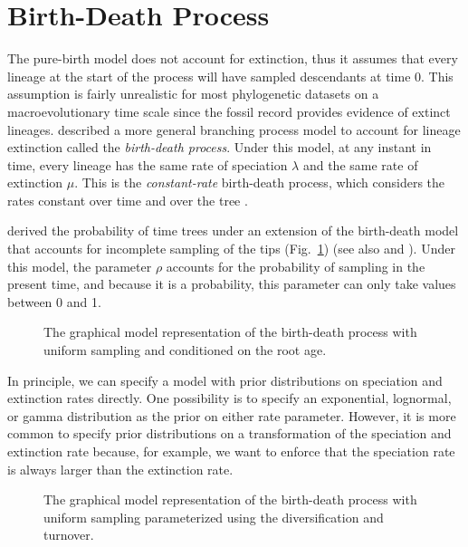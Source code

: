 \bigskip
\section{Birth-Death Process}\label{birthDeathSec}

The pure-birth model does not account for extinction, thus it assumes that every lineage at the start of the process will have sampled descendants at time 0.
This assumption is fairly unrealistic for most phylogenetic datasets on a macroevolutionary time scale since the fossil record provides evidence of extinct lineages.
\citet{Kendall1948} described a more general branching process model to account for lineage extinction called the \emph{birth-death process}.
Under this model, at any instant in time, every lineage has the same rate of speciation $\lambda$ and the same rate of extinction $\mu$.
This is the \emph{constant-rate} birth-death process, which considers the rates constant over time and over the tree \citep{Nee1994b,Hoehna2015a}.

\citet{Yang1997} derived the probability of time trees under an extension of the birth-death model that accounts for incomplete sampling of the tips (Fig.~\ref{bdrGMFig1}) (see also \cite{Stadler2009} and \cite{Hoehna2014a}).
Under this model, the parameter $\rho$ accounts for the probability of sampling in the present time, and because it is a probability, this parameter can only take values between 0 and 1.
\begin{figure}[h!]
\centering
{}
\caption{\small The graphical model representation of the birth-death process with uniform sampling and conditioned on the root age.}
\label{bdrGMFig1}
\end{figure}

In principle, we can specify a model with prior distributions on speciation and extinction rates directly.
One possibility is to specify an exponential, lognormal, or gamma distribution as the prior on either rate parameter.
However, it is more common to specify prior distributions on a transformation of the speciation and extinction rate because, for example, we want to enforce that the speciation rate is always larger than the extinction rate.


\begin{figure}[h!]
\centering
{}
\caption{\small The graphical model representation of the birth-death process with uniform sampling parameterized using the diversification and turnover.}
\label{bdrGMFig2}
\end{figure}

